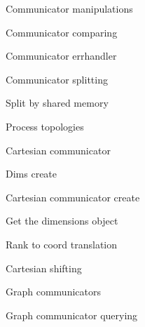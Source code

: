 \documentclass[10pt]{beamer}
\begin{document}
 {Communicator manipulations}

\begin{numberedframe}{Communicator comparing}
  
\end{numberedframe}
\begin{numberedframe}{Communicator errhandler}
  
\end{numberedframe}
\begin{numberedframe}{Communicator splitting}
  
\end{numberedframe}
\begin{numberedframe}{Split by shared memory}
  
\end{numberedframe}

 {Process topologies}

\begin{numberedframe}{Cartesian communicator}
  
\end{numberedframe}

\begin{numberedframe}{Dims create}
  
\end{numberedframe}

\begin{numberedframe}{Cartesian communicator create}
  
\end{numberedframe}

\begin{numberedframe}{Get the dimensions object}
  
\end{numberedframe}

\begin{numberedframe}{Rank to coord translation}
  
\end{numberedframe}

\begin{numberedframe}{Cartesian shifting}
    
\end{numberedframe}

\begin{numberedframe}{Graph communicators}
  
\end{numberedframe}
\begin{numberedframe}{Graph communicator querying}
  
\end{numberedframe}
\end{document}
